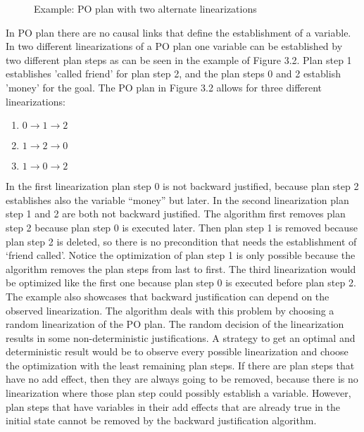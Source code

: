 \begin{figure}[h]
    \caption{Example: PO plan with two alternate linearizations}
\end{figure}

In PO plan there are no causal links that define the establishment of a variable. In two different linearizations 
of a PO plan one variable can be established by two different plan steps as can be seen in the example of Figure 3.2.
Plan step 1 establishes 'called friend' for plan step 2, and the plan steps 0 and 2 establish 'money' for the goal.
The PO plan in Figure 3.2 allows for three different linearizations: 
\begin{enumerate}
    \item $0 \to 1 \to 2 $
    \item $1 \to 2 \to 0$
    \item $1 \to 0 \to 2$
\end{enumerate}
In the first linearization plan step 0 is not backward justified, because plan step 2 establishes also the variable \enquote{money} but later.
In the second linearization plan step 1 and 2 are both not backward justified. The algorithm first removes plan step 2 
because plan step 0 is executed later. Then plan step 1 is removed because plan step 2 is deleted, so there is no precondition that needs the
establishment of \enquote*{friend called}. Notice the optimization of plan step 1 is only possible because the algorithm removes the plan steps from last to first.
The third linearization would be optimized like the first one because plan step 0 is executed before plan step 2. 
The example also showcases that backward justification can depend on the observed linearization. The algorithm deals with this problem 
by choosing a random linearization of the PO plan. The random decision of the linearization results in some non-deterministic justifications.
A strategy to get an optimal and deterministic result would be to observe every possible linearization and choose the optimization with the least
remaining plan steps. If there are plan steps that have no add effect, then they are always going to be removed, because there is no 
linearization where those plan step could possibly establish a variable. However, plan steps that have variables in their add effects that are already true
in the initial state cannot be removed by the backward justification algorithm.


